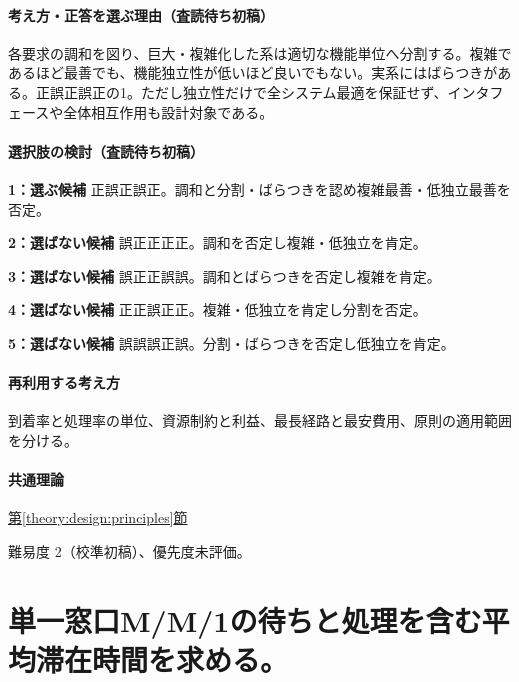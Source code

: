 \paragraph{考え方・正答を選ぶ理由（査読待ち初稿）} 各要求の調和を図り、巨大・複雑化した系は適切な機能単位へ分割する。複雑であるほど最善でも、機能独立性が低いほど良いでもない。実系にはばらつきがある。正誤正誤正の1。ただし独立性だけで全システム最適を保証せず、インタフェースや全体相互作用も設計対象である。

\paragraph{選択肢の検討（査読待ち初稿）}\mbox{}\par

\noindent\textbf{1：選ぶ候補} 正誤正誤正。調和と分割・ばらつきを認め複雑最善・低独立最善を否定。\par

\noindent\textbf{2：選ばない候補} 誤正正正正。調和を否定し複雑・低独立を肯定。\par

\noindent\textbf{3：選ばない候補} 誤正正誤誤。調和とばらつきを否定し複雑を肯定。\par

\noindent\textbf{4：選ばない候補} 正正誤正正。複雑・低独立を肯定し分割を否定。\par

\noindent\textbf{5：選ばない候補} 誤誤誤正誤。分割・ばらつきを否定し低独立を肯定。\par

\paragraph{再利用する考え方} 到着率と処理率の単位、資源制約と利益、最長経路と最安費用、原則の適用範囲を分ける。

\paragraph{共通理論} \hyperref[theory:design:principles]{第\ref*{theory:design:principles}節}

\par 難易度 2（校準初稿）、優先度未評価。

\section{単一窓口M/M/1の待ちと処理を含む平均滞在時間を求める。}

